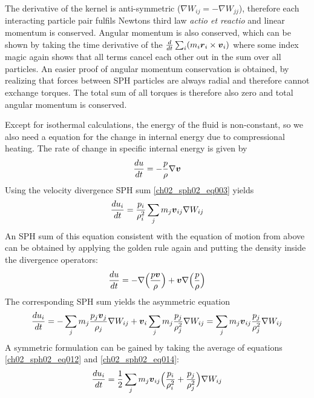 The derivative of the kernel is anti-symmetric ($\nabla W_{ij} = - \nabla W_{jj}$), therefore each interacting particle pair fulfils Newtons third law \emph{actio et reactio} and linear momentum is conserved. Angular momentum is also conserved, which can be shown by taking the time derivative of the $\frac{d}{dt} \sum_i (m_i \boldsymbol{r}_i \times \boldsymbol{v}_i)$ where some index magic \citep{Price:2004p2613} again shows that all terms cancel each other out in the sum over all particles. An easier proof of angular momentum conservation is obtained, by realizing that forces between SPH particles are always radial and therefore cannot exchange torques. The total sum of all torques is therefore also zero and total angular momentum is conserved.

Except for isothermal calculations, the energy of the fluid is non-constant, so we also need a equation for the change in internal energy due to compressional heating. The rate of change in specific internal energy is given by 
\begin{equation}
\label{ch02_sph02_eq011}
\frac{du}{dt} = -\frac{p}{\rho} \nabla \boldsymbol{v}
\end{equation}
Using the velocity divergence SPH sum \ref{ch02_sph02_eq003}  yields
\begin{equation}
\label{ch02_sph02_eq012}
\frac{du_i}{dt} = \frac{p_i}{\rho_i^2} \sum_{j} m_j \boldsymbol{v}_{ij}  \nabla W_{ij}
\end{equation}
An SPH sum of this equation consistent with the equation of motion from above can be obtained by applying the golden rule again and putting the density inside the divergence operators:
\begin{equation}
\label{ch02_sph02_eq013}
\frac{du}{dt} = - \nabla \Big( \frac{p \boldsymbol{v}}{\rho} \Big) + \boldsymbol{v} \nabla \Big( \frac{p}{\rho} \Big)
\end{equation}
The corresponding SPH sum yields the asymmetric equation
\begin{equation}
\label{ch02_sph02_eq014}
\frac{du_i}{dt} = - \sum_{j} m_{j} \frac{p_j \boldsymbol{v}_j}{\rho_j} \nabla W_{ij} + \boldsymbol{v}_i \sum_{j} m_{j} \frac{p_j}{\rho_j^2}  \nabla W_{ij} = \sum_{j} m_j \boldsymbol{v}_{ij} \frac{p_j}{\rho_j^2}  \nabla W_{ij}
\end{equation}
A symmetric formulation can be gained by taking the average of equations \ref{ch02_sph02_eq012} and \ref{ch02_sph02_eq014}:
\begin{equation}
\label{ch02_sph02_eq015}
\frac{du_i}{dt} = \frac{1}{2} \sum_{j} m_{j} \boldsymbol{v}_{ij} \Big( \frac{p_i}{\rho_i^2}  + \frac{p_j}{\rho_j^2} \Big) \nabla W_{ij}
\end{equation}

